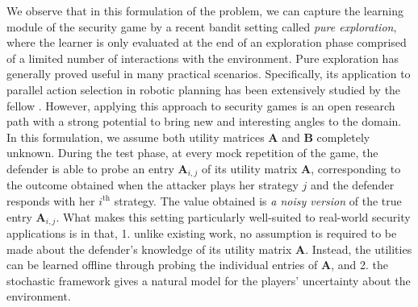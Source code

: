 We observe that in this formulation of the problem, we can capture the learning module of the security game by a recent bandit setting called \textit{pure exploration}, where the learner is only evaluated at the end of an exploration phase comprised of a limited number of interactions with the environment. Pure exploration has generally proved useful in many practical scenarios. Specifically, its application to parallel action selection in robotic planning has been extensively studied by the fellow \cite{Gabillon11MB}. 
However, applying this approach to security games is an open research path with a strong potential to bring new and interesting angles to the domain. 
In this formulation, we assume both utility matrices $\boldsymbol A$ and $\boldsymbol B$ completely unknown. During the test phase, at every  mock repetition of the game, the defender is able to probe an entry $\boldsymbol A_{i,j}$ of its utility matrix $\boldsymbol A$, corresponding to the outcome obtained when the attacker plays her strategy $j$ and the defender responds with her $i^{\text{th}}$ strategy. The value obtained is {\em a noisy version} of the true entry $\boldsymbol A_{i,j}$. What makes this setting particularly well-suited to real-world security applications is in that, 
1. unlike existing work, no assumption is required to be made about the defender's knowledge of its utility matrix $\boldsymbol A$. Instead, the utilities can be learned offline through probing the individual entries of $\boldsymbol A$, and 
2. the stochastic framework gives a natural model for the players' uncertainty about the environment.
%
 
